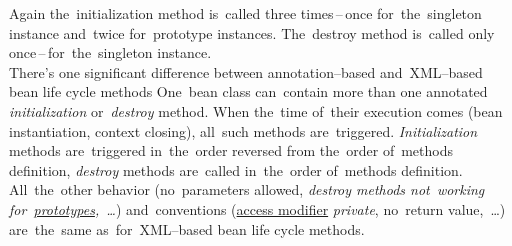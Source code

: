 
\noindent Again the~initialization method is~called three times\,--\,once for~the~singleton instance and~twice for~prototype instances. The~destroy method is~called only once\,--\,for~the~singleton instance.\\

\note There's one significant difference between annotation--based and~XML--based bean life cycle methods  One~bean class can~contain more than one annotated \textit{initialization} or~\textit{destroy} method. When the~time of~their execution comes (bean instantiation, context closing), all~such methods are~triggered. \textit{Initialization} methods are~triggered in~the~order reversed from the~order of~methods definition, \textit{destroy} methods are~called in~the~order of~methods definition. All~the~other behavior (no~parameters allowed, \textit{destroy methods not~working for~\hyperref[prototypedp]{prototypes},~\dots}) and~conventions (\hyperref[accessmodifiers]{access modifier} \textit{private}, no~return value,~\dots) are~the~same as~for~XML--based bean life cycle methods.
\newpage

